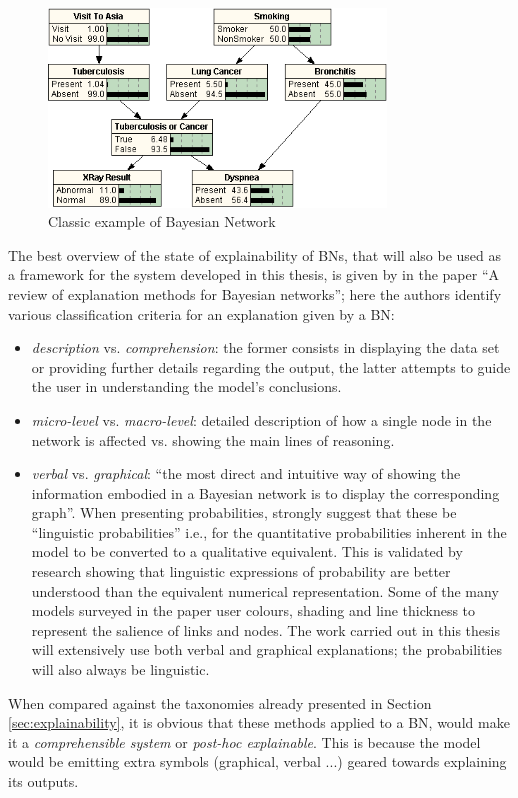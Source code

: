 \begin{figure}[htbp]
\centerline{\includegraphics[width=0.8\textwidth]{literature-review/images/asia-bn}}
\caption{Classic example of Bayesian Network \citep{asiabn}}
\label{fig:asia-bn}
\end{figure}

The best overview of the state of explainability of BNs, that will also be used as a framework for the system developed in this thesis, is given by \citet{lacave2002review} in the paper \enquote{A review of explanation methods for Bayesian networks}; here the authors identify various classification criteria for an explanation given by a BN:
\begin{itemize}
  \item \textit{description} vs. \textit{comprehension}: the former consists in displaying the data set or providing further details regarding the output, the latter attempts to guide the user in understanding the model's conclusions.
  \item \textit{micro-level} vs. \textit{macro-level}: detailed description of how a single node in the network is affected vs. showing the main lines of reasoning.
  \item \textit{verbal} vs. \textit{graphical}: \enquote{the most direct and intuitive way of showing the information embodied in a Bayesian network is to display the corresponding graph}.
  When presenting probabilities, \citet{henrion1990qualtitative} strongly suggest that these be \enquote{linguistic probabilities} i.e., for the quantitative probabilities inherent in the model to be converted to a qualitative equivalent.
  This is validated by research showing that linguistic expressions of probability are better understood than the equivalent numerical representation. 
  Some of the many models surveyed in the paper user colours, shading and line thickness to represent the salience of links and nodes.
  The work carried out in this thesis will extensively use both verbal and graphical explanations; the probabilities will also always be linguistic.
\end{itemize}
When compared against the taxonomies already presented in Section \ref{sec:explainability}, it is obvious that these methods applied to a BN, would make it a \textit{comprehensible system} or \textit{post-hoc explainable}.
This is because the model would be emitting extra symbols (graphical, verbal ...) geared towards explaining its outputs.

